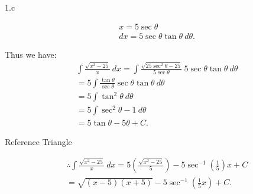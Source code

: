 \documentclass{report}
\begin{document}
    \bigbreak \noindent 
    1.c
    \bigbreak \noindent 
    \begin{minipage}[t]{0.47\textwidth}
       \begin{align*}
            &x= 5\sec{\theta } \\     
            &dx = 5\sec{\theta }\tan{\theta }\ d\theta 
       .\end{align*} 
    \end{minipage}
    \begin{minipage}[t]{0.47\textwidth}
        Thus we have:
        \begin{align*}
            &\int \frac{\sqrt{x^{2} -25}}{x}\ dx = \int \frac{\sqrt{25\sec^{2}{\theta } - 25}}{5\sec{\theta }}\ 5\sec{\theta }\tan{\theta }\ d\theta  \\
            &=5\int \frac{\tan{\theta }}{\sec{\theta }}\sec{\theta }\tan{\theta }\ d\theta  \\
            &=5\int \tan^{2}{\theta }\ d\theta  \\
            &=5\int \sec^{2}{\theta } -1\ d\theta  \\
            &=5\tan{\theta } - 5\theta  + C
        .\end{align*}
    
    \end{minipage}

    \pagebreak \bigbreak \noindent 
    \begin{minipage}[]{0.47\textwidth}
        Reference Triangle
        \bigbreak \noindent 
    \end{minipage}
    \begin{minipage}[]{0.47\textwidth}
        \begin{align*}
            &\therefore \int \frac{\sqrt{x^{2}-25}}{x}\ dx = 5\left(\frac{\sqrt{x^{2}-25}}{5}\right)-5\sec^{-1}{\left(\frac{1}{5}\right)x} + C \\
            &= \sqrt{(x-5)(x+5)}-5\sec^{-1}{\left(\frac{1}{5}x\right)} + C
        .\end{align*}
    \end{minipage}
\end{document}
